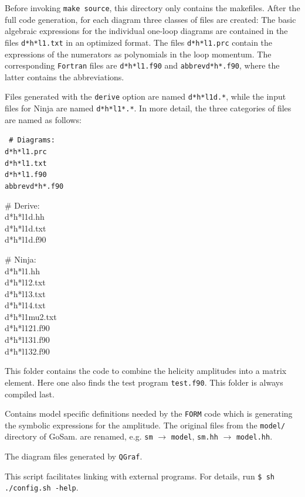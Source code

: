 \documentclass[11pt,a4paper]{refrep}
\newcommand{\gosamversion}{{2{.}0}}
\newcommand{\gosamv}[1][\gosamversion]{{\sc GoSam}\xspace}
\newcommand{\qgraf}{{\tt QGraf}\xspace}
\newcommand{\form}{{\tt FORM}\xspace}
\newcommand{\ninja}{{\sc Ninja}\xspace}
\begin{document}
Before invoking \texttt{make source}, 
this directory only contains the makefiles. After the full code
generation, for each diagram three classes of files are created: The
basic algebraic expressions for the individual one-loop diagrams are
contained in the files {\tt d*h*l1.txt} in an optimized format. The
files {\tt d*h*l1.prc} contain the expressions of the numerators as 
polynomials in the loop momentum. The corresponding {\tt Fortran} files
are {\tt d*h*l1.f90} and {\tt abbrevd*h*.f90}, where the latter
contains the abbreviations. 

Files generated with the {\tt derive} option  are
named {\tt d*h*l1d.*}, while the input files
for \ninja{}  are named {\tt d*h*l1*.*}. 
In more detail, the three categories of files are named as follows:\\
{\tt
\# Diagrams:\\
 d*h*l1.prc\\
 d*h*l1.txt\\
 d*h*l1.f90\\
 abbrevd*h*.f90

\# Derive:\\
 d*h*l1d.hh\\
 d*h*l1d.txt\\
 d*h*l1d.f90

\# Ninja:\\
 d*h*l1.hh\\
 d*h*l12.txt\\
 d*h*l13.txt\\
 d*h*l14.txt\\
 d*h*l1mu2.txt\\
 d*h*l121.f90\\
 d*h*l131.f90\\
 d*h*l132.f90
}

 This folder contains the code to combine
the helicity amplitudes into a matrix element. Here one also finds
the test program \texttt{test.f90}. This folder is always compiled last.

Contains model specific definitions needed by the \form code
which is generating the symbolic expressions for the amplitude.
The original files from the \texttt{model/} directory of \gosamv. 
are renamed, e.g.
\texttt{sm} $\to$ \texttt{model}, \texttt{sm.hh} $\to$ \texttt{model.hh}.

 The diagram files generated
by \qgraf.

 This script facilitates linking with external
programs. For details, run
{\tt \$ sh ./config.sh -help}.
\end{document}
